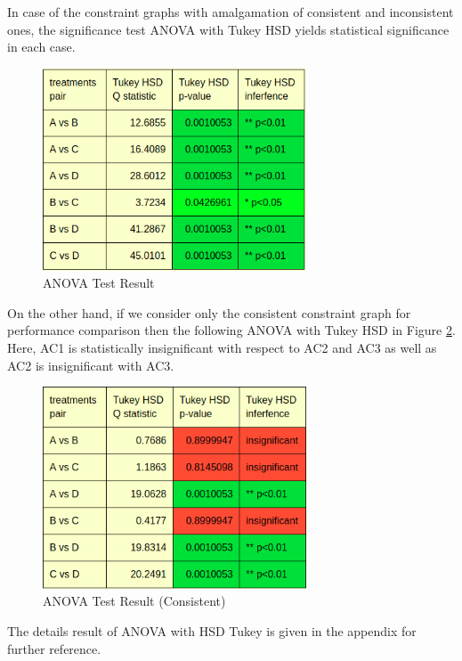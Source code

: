 \documentclass[10pt,twocolumn]{article}
\begin{document}
In case of the constraint graphs with amalgamation of consistent and inconsistent ones, the significance test ANOVA with Tukey HSD yields statistical significance in each case.  
\begin{figure}[H]
	\includegraphics[width = \columnwidth, height = 6cm]{anova_1}
	\caption{ANOVA Test Result}
	\label{fig:05}
\end{figure}
On the other hand, if we consider only the consistent constraint graph for performance comparison then the following ANOVA with Tukey HSD in Figure \ref{fig:06}. Here, AC1 is statistically insignificant with respect to AC2 and AC3 as well as AC2 is insignificant with AC3.
\begin{figure}[H]
	\includegraphics[width = \columnwidth, height = 6cm]{anova_2}
	\caption{ANOVA Test Result (Consistent)}
	\label{fig:06}
\end{figure}
The details result of ANOVA with HSD Tukey is given in the appendix for further reference.
\end{document}
